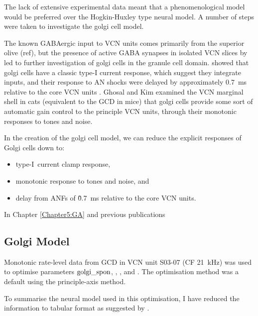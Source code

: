 \documentclass{article}
\begin{document}
The lack of extensive experimental data meant that a phenomenological model
would be preferred over the Hogkin-Huxley type neural model. A number of steps
were taken to investigate the golgi cell model.

The known GABAergic input to VCN units comes primarily from the superior olive
(ref), but the presence of active GABA synapses in isolated VCN slices by
\citet{FerragamoGoldingEtAl:1998} led to further investigation of
golgi cells in the granule cell domain. \citet{FerragamoGoldingEtAl:1998a}
showed that golgi cells have a classic type-I current
response, which suggest they integrate inputs, and their response to
AN shocks were delayed by approximately 0.7~ms relative to the core
VCN units .  Ghosal and Kim
\citet{GhoshalKim:1997} examined the VCN marginal shell in cats (equivalent to the
GCD in mice) that golgi cells provide some sort of
automatic gain control to the principle VCN units, through their monotonic
responses to tones and noise.

 



   

In the creation of the golgi cell model, we can reduce the explicit
responses of Golgi cells down to:
\begin{itemize}
\item type-I~current clamp response,
\item monotonic response to tones and noise, and
\item delay from ANFs of \~0.7~ms relative to the core VCN units.
\end{itemize}


In Chapter \ref{Chapter5:GA} and previous publications \citep{EagerGraydenEtAl:2006a}


\subsection{Golgi Model}

Monotonic rate-level data from GCD in VCN \citep{GhoshalKim:1996} unit S03-07
(CF 21~kHz) was used to optimise parameters ${\rm golgi\_spon}$, \wLSRGLG,
\wHSRGLG, and  \sANFGLG.  The optimisation method was a default  using the principle-axis method.


To summarise the neural model used in this optimisation, I have
reduced the information to tabular format as suggested by
\citet{NordlieGewaltigEtAl:2009}.
\end{document}
